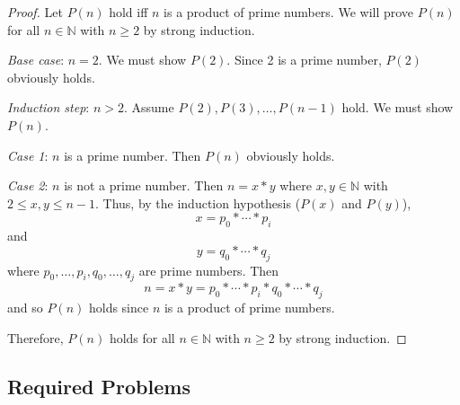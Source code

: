 \documentclass[11pt,fleqn]{article}
\begin{document}
\begin{enumerate}
\begin{proof}
Let $P(n)$ hold iff $n$ is a product of prime numbers.  We will prove
$P(n)$ for all $n \in \mathbb{N}$ with $n \ge 2$ by strong induction.

\medskip

\emph{Base case}: $n = 2$.  We must show $P(2)$.  Since 2 is a prime
number, $P(2)$ obviously holds.

\medskip

\emph{Induction step}: $n > 2$.  Assume $P(2), P(3), \ldots, P(n-1)$
hold.  We must show $P(n)$.

\emph{Case 1}: $n$ is a prime number.  Then $P(n)$ obviously holds.

\emph{Case 2}: $n$ is not a prime number.  Then $n = x * y$ where $x,y
\in \mathbb{N}$ with $2 \le x,y \le n - 1$.  Thus, by the induction
hypothesis ($P(x)$ and $P(y)$), \[x = p_0 * \cdots *p_i\] and \[y =
q_0 * \cdots *q_j\] where $p_0,\ldots,p_i,q_0,\ldots,q_j$ are prime
numbers.  Then \[n = x * y = p_0 * \cdots * p_i * q_0 * \cdots * q_j\]
and so $P(n)$ holds since $n$ is a product of prime numbers.

\medskip

Therefore, $P(n)$ holds for all $n \in \mathbb{N}$ with $n \ge 2$ by
strong induction.
\end{proof}

\end{enumerate}

\subsection*{Required Problems}
\end{document}
